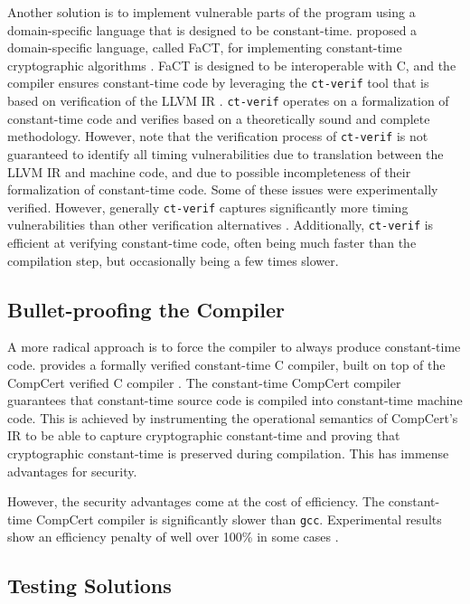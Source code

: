 Another solution is to implement vulnerable parts of the program using a domain-specific language that is designed to be constant-time.
\citeauthor{fact} proposed a domain-specific language, called FaCT, for implementing constant-time cryptographic algorithms \citep{fact}.
FaCT is designed to be interoperable with C, and the compiler ensures constant-time code by leveraging the \texttt{ct-verif} tool that is based on verification of the LLVM IR \cite{verifying-constant-time-llvm}.
\texttt{ct-verif} operates on a formalization of constant-time code and verifies based on a theoretically sound and complete methodology.
However, \citeauthor{verifying-constant-time-llvm} note that the verification process of \texttt{ct-verif} is not guaranteed to identify all timing vulnerabilities due to translation between the LLVM IR and machine code, and due to possible incompleteness of their formalization of constant-time code. 
Some of these issues were experimentally verified.
However, generally \texttt{ct-verif} captures significantly more timing vulnerabilities than other verification alternatives \citep{verifying-constant-time-llvm}.
Additionally, \texttt{ct-verif} is efficient at verifying constant-time code, often being much faster than the compilation step, but occasionally being a few times slower.

\subsection{Bullet-proofing the Compiler}
A more radical approach is to force the compiler to always produce constant-time code.
\citeauthor{verified-constant-time-c-comiler} provides a formally verified constant-time C compiler, built on top of the CompCert verified C compiler \citep{verified-constant-time-c-comiler}. 
The constant-time CompCert compiler guarantees that constant-time source code is compiled into constant-time machine code.
This is achieved by instrumenting the operational semantics of CompCert's IR to be able to capture cryptographic constant-time and proving that cryptographic constant-time is preserved during compilation. 
This has immense advantages for security.

However, the security advantages come at the cost of efficiency. 
The constant-time CompCert compiler is significantly slower than \texttt{gcc}.
Experimental results show an efficiency penalty of well over 100\% in some cases \citep{verified-constant-time-c-comiler}.

\subsection{Testing Solutions}

